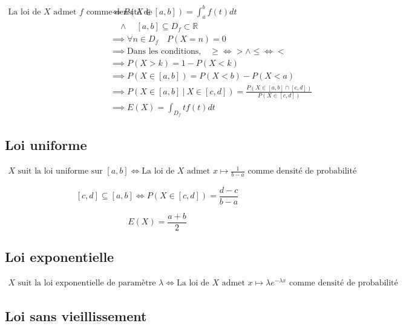 \documentclass{article}
\newcommand{\R}{\mathds{R}}
\begin{document}
\begin{equation*}
    \begin{split}
        \text{La loi de $X$ admet $f$ comme densité de probabilité} &\iff P(X \in [a, b]) = \int_a^b f(t)dt \\
        &\quad \land \quad [a, b] \subseteq D_f \subset \R \\
        &\implies \forall n \in D_f \quad P(X = n) = 0 \\
        &\implies \text{Dans les conditions,}\quad \geq \iff > \land \leq \iff <\\
        &\implies P(X > k) = 1-P(X < k) \\
        &\implies P(X \in [a, b]) = P(X < b) - P(X < a) \\
        &\implies P(X \in [a, b] \:|\: X \in [c, d]) = \frac{P(X \in [a, b] \cap [c, d])}{P(X \in [c, d])} \\
        &\implies E(X) = \int_{D_f} tf(t)dt
    \end{split}
\end{equation*}

\subsection{Loi uniforme}

\begin{equation*}
    \begin{split}
        \text{$X$ suit la loi uniforme sur $[a, b]$} \iff \text{La loi de $X$ admet $x\mapsto \frac{1}{b-a}$ comme densité de probabilité}
    \end{split}
\end{equation*}

\[[c, d] \subseteq [a, b] \iff P(X \in [c, d]) = \frac{d-c}{b-a}\]

\[E(X) = \frac{a+b}{2}\]

\subsection{Loi exponentielle}

\begin{equation*}
    \begin{split}
        \text{$X$ suit la loi exponentielle de paramètre $\lambda$} \iff \text{La loi de $X$ admet $x\mapsto \lambda e^{-\lambda x}$ comme densité de probabilité}
    \end{split}
\end{equation*}

\subsection{Loi sans vieillissement}
\end{document}
